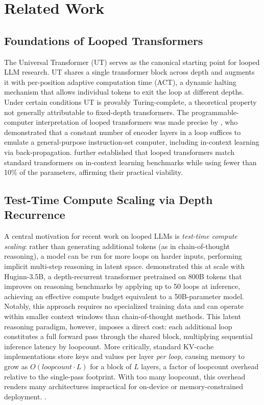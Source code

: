 \section{Related Work}
\label{sec:related}

\subsection{Foundations of Looped Transformers}
\label{sec:related-foundations}

The Universal Transformer (UT) \citep{dehghani2018universal} serves as the
canonical starting point for looped LLM research.
UT shares a single transformer block across depth and augments it with
per-position adaptive computation time (ACT), a dynamic halting mechanism
that allows individual tokens to exit the loop at different depths.
Under certain conditions UT is provably Turing-complete, a theoretical
property not generally attributable to fixed-depth transformers.
The programmable-computer interpretation of looped transformers was made
precise by \citet{giannou2023looped}, who demonstrated that a constant number
of encoder layers in a loop suffices to emulate a general-purpose
instruction-set computer, including in-context learning via
back-propagation.
\citet{yang2023looped} further established that looped transformers match
standard transformers on in-context learning benchmarks while using fewer than
10\% of the parameters, affirming their practical viability.

\subsection{Test-Time Compute Scaling via Depth Recurrence}
\label{sec:related-scaling}

A central motivation for recent work on looped LLMs is \emph{test-time compute
scaling}: rather than generating additional tokens (as in chain-of-thought
reasoning), a model can be run for more loops on harder inputs, performing
implicit multi-step reasoning in latent space.
\citet{geiping2025scaling} demonstrated this at scale with Huginn-3.5B, a
depth-recurrent transformer pretrained on 800B tokens that improves on
reasoning benchmarks by applying up to 50 loops at inference, achieving an
effective compute budget equivalent to a 50B-parameter model.
Notably, this approach requires no specialized training data and can operate
within smaller context windows than chain-of-thought methods. This latent reasoning paradigm, however, imposes a direct cost:
each additional loop constitutes a full forward pass through the shared
block, multiplying sequential inference latency by loopcount.
More critically, standard KV-cache implementations store keys and values
per layer \emph{per loop}, causing memory to grow as $O(loopcount \cdot L)$
for a block of $L$ layers, a factor of loopcount overhead relative to the
single-pass footprint.
With too many loopcount, this overhead renders many architectures
impractical for on-device or memory-constrained deployment.
\citep{vendrell2026memoryefficient}.

